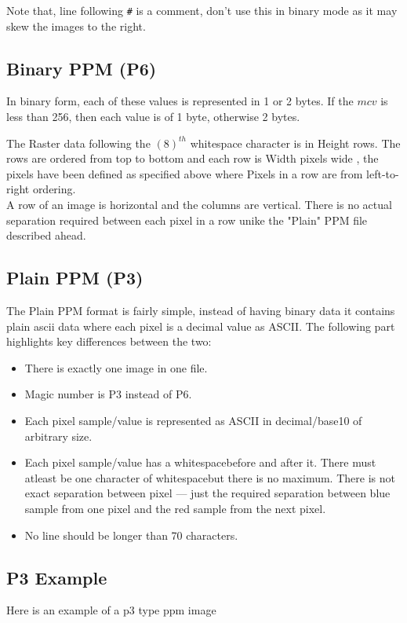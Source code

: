\documentclass{article}
\begin{document}
Note that, line following \verb|#| is a comment, don't use this in binary mode
as it may skew the images to the right.

\subsection{Binary PPM (P6)}

In binary form, each of these values is represented in 1 or 2 bytes.
If the $mcv$ is less than 256, then each value is of 1 byte, otherwise 2 bytes.

The Raster data following the $(8)^{th}$ whitespace character is in Height 
rows. The rows are ordered from top to bottom and each row is Width pixels wide
, the pixels have been defined as specified above where Pixels in a row are
 from left-to-right ordering. 
\\
A row of an image is horizontal and the columns are vertical. There is no actual
separation required between each pixel in a row unike the "Plain" PPM file 
described ahead.

\subsection{Plain PPM (P3)}

The Plain PPM format is fairly simple, instead of having binary data it
contains plain ascii data where each pixel is a decimal value as ASCII.
The following part highlights key differences between the two:
\begin{itemize}
    \item There is exactly one image in one file.
    \item Magic number is P3 instead of P6.
    \item Each pixel sample/value is represented as ASCII in 
    decimal/base10 of arbitrary size.
    \item Each pixel sample/value has a whitespace\footnotemark[1] before and
    after it. There must atleast be one character of whitespace\footnotemark[1]
    but there is no maximum. There is not exact separation between pixel --- 
    just the required separation between blue sample from one pixel and the red
    sample from the next pixel.
    \item No line should be longer than 70 characters.
\end{itemize}

\subsection{P3 Example}
Here is an example of a p3 type ppm image
\end{document}
